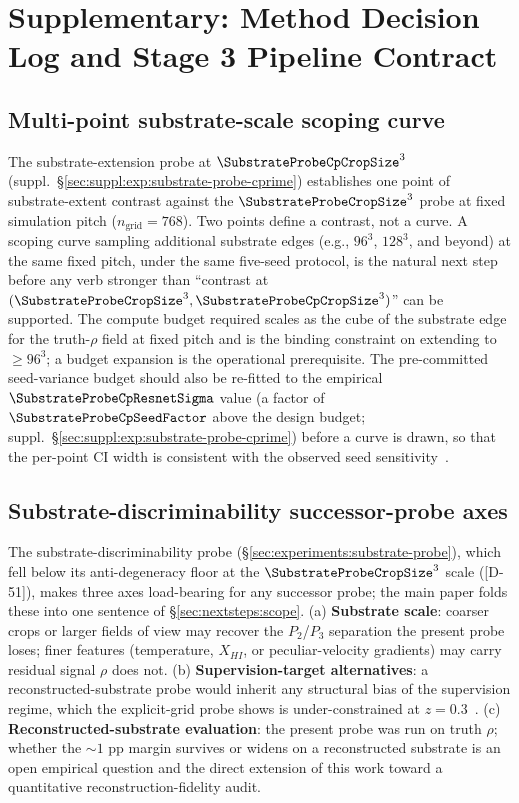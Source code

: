 \section{Supplementary: Method Decision Log and Stage 3 Pipeline Contract}
\label{sec:suppl:nextsteps}

\subsection{Multi-point substrate-scale scoping curve}
\label{sec:suppl:nextsteps:substrate-curve}
The substrate-extension probe at $\SubstrateProbeCpCropSize^3$ (suppl.\ \S\ref{sec:suppl:exp:substrate-probe-cprime}) establishes one point of substrate-extent contrast against the $\SubstrateProbeCropSize^3$ probe at fixed simulation pitch ($n_{\text{grid}}=768$). Two points define a contrast, not a curve. A scoping curve sampling additional substrate edges (e.g., $96^3$, $128^3$, and beyond) at the same fixed pitch, under the same five-seed protocol, is the natural next step before any verb stronger than ``contrast at $(\SubstrateProbeCropSize^3, \SubstrateProbeCpCropSize^3)$'' can be supported. The compute budget required scales as the cube of the substrate edge for the truth-$\rho$ field at fixed pitch and is the binding constraint on extending to $\geq 96^3$; a budget expansion is the operational prerequisite. The pre-committed seed-variance budget should also be re-fitted to the empirical $\SubstrateProbeCpResnetSigma$ value (a factor of $\SubstrateProbeCpSeedFactor$ above the design budget; suppl.\ \S\ref{sec:suppl:exp:substrate-probe-cprime}) before a curve is drawn, so that the per-point CI width is consistent with the observed seed sensitivity~\cite{damour2020underspecification}.

\subsection{Substrate-discriminability successor-probe axes}
\label{sec:suppl:nextsteps:substrate-axes}
The substrate-discriminability probe (\S\ref{sec:experiments:substrate-probe}), which fell below its anti-degeneracy floor at the $\SubstrateProbeCropSize^3$ scale ([D-51]), makes three axes load-bearing for any successor probe; the main paper folds these into one sentence of \S\ref{sec:nextsteps:scope}. (a) \textbf{Substrate scale}: coarser crops or larger fields of view may recover the $P_2$/$P_3$ separation the present probe loses; finer features (temperature, $X_{HI}$, or peculiar-velocity gradients) may carry residual signal $\rho$ does not. (b) \textbf{Supervision-target alternatives}: a reconstructed-substrate probe would inherit any structural bias of the supervision regime, which the explicit-grid probe shows is under-constrained at $z = 0.3$~\cite{manheim_garrabrant2018}. (c) \textbf{Reconstructed-substrate evaluation}: the present probe was run on truth $\rho$; whether the $\sim\!1$ pp margin survives or widens on a reconstructed substrate is an open empirical question and the direct extension of this work toward a quantitative reconstruction-fidelity audit.

